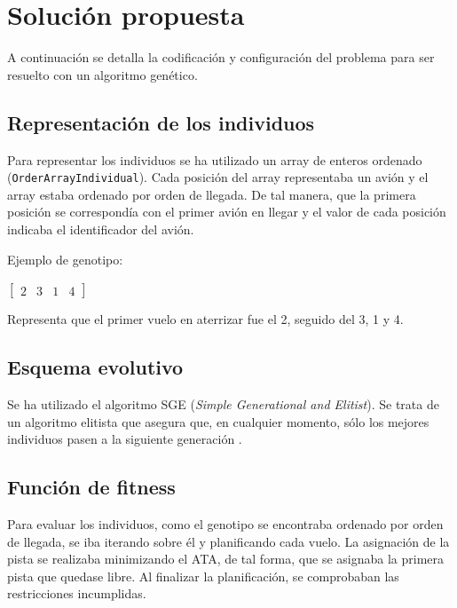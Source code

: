\documentclass[a4paper,12pt,titlepage]{article}
\begin{document}
\section{Solución propuesta}

A continuación se detalla la codificación y configuración del problema para ser resuelto con un algoritmo genético.

\subsection{Representación de los individuos}

Para representar los individuos se ha utilizado un array de enteros ordenado (\lstinline|OrderArrayIndividual|). Cada posición del array representaba un avión y el array estaba ordenado por orden de llegada. De tal manera, que la primera posición se correspondía con el primer avión en llegar y el valor de cada posición indicaba el identificador del avión.

Ejemplo de genotipo:

\begin{center}
$
\begin{bmatrix}
	2 & 3 & 1 & 4
\end{bmatrix}
$
\end{center}

Representa que el primer vuelo en aterrizar fue el 2, seguido del 3, 1 y 4.

\subsection{Esquema evolutivo}

Se ha utilizado el algoritmo SGE (\textit{Simple Generational and Elitist}). Se trata de un algoritmo elitista que asegura que, en cualquier momento, sólo los mejores individuos pasen a la siguiente generación \citep{jclec:sge}.

\subsection{Función de fitness}

Para evaluar los individuos, como el genotipo se encontraba ordenado por orden de llegada, se iba iterando sobre él y planificando cada vuelo. La asignación de la pista se realizaba minimizando el ATA, de tal forma, que se asignaba la primera pista que quedase libre. Al finalizar la planificación, se comprobaban las restricciones incumplidas.
\end{document}
